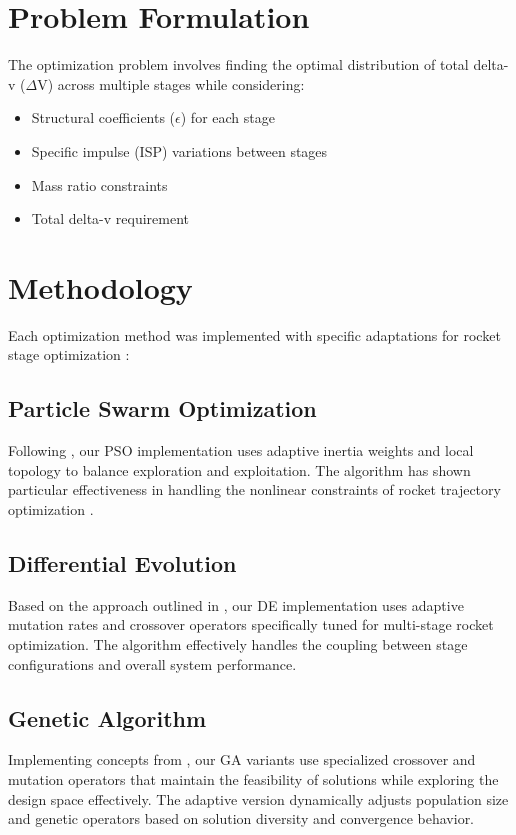 \documentclass[11pt]{article}
\begin{document}
\section{Problem Formulation}
The optimization problem involves finding the optimal distribution of total delta-v ($\Delta$V) across multiple stages while considering:
\begin{itemize}
    \item Structural coefficients ($\epsilon$) for each stage
    \item Specific impulse (ISP) variations between stages
    \item Mass ratio constraints \cite{evolutionary_rocket_2022}
    \item Total delta-v requirement \cite{pso_ascent_2013}
\end{itemize}

\section{Methodology}
Each optimization method was implemented with specific adaptations for rocket stage optimization \cite{de_ascent_2021}:

\subsection{Particle Swarm Optimization}
Following \cite{pso_ascent_2013}, our PSO implementation uses adaptive inertia weights and local topology to balance exploration and exploitation. The algorithm has shown particular effectiveness in handling the nonlinear constraints of rocket trajectory optimization \cite{pso_micro_launch_2012}.

\subsection{Differential Evolution}
Based on the approach outlined in \cite{de_ascent_2021}, our DE implementation uses adaptive mutation rates and crossover operators specifically tuned for multi-stage rocket optimization. The algorithm effectively handles the coupling between stage configurations and overall system performance.

\subsection{Genetic Algorithm}
Implementing concepts from \cite{evolutionary_rocket_2022}, our GA variants use specialized crossover and mutation operators that maintain the feasibility of solutions while exploring the design space effectively. The adaptive version dynamically adjusts population size and genetic operators based on solution diversity and convergence behavior.
\end{document}
